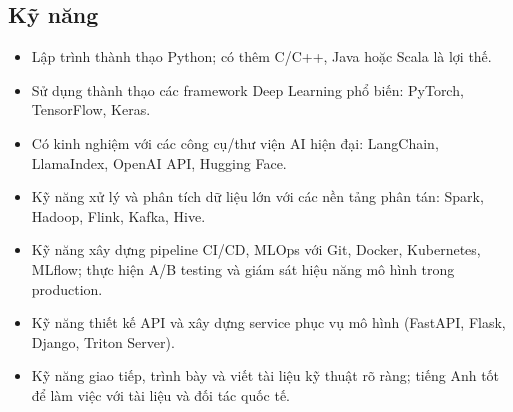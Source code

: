 \subsection{Kỹ năng}
\begin{itemize}
    \item Lập trình thành thạo Python; có thêm C/C++, Java hoặc Scala là lợi thế.
    \item Sử dụng thành thạo các framework Deep Learning phổ biến: PyTorch, TensorFlow, Keras.
    \item Có kinh nghiệm với các công cụ/thư viện AI hiện đại: LangChain, LlamaIndex, OpenAI API, Hugging Face.
    \item Kỹ năng xử lý và phân tích dữ liệu lớn với các nền tảng phân tán: Spark, Hadoop, Flink, Kafka, Hive.
    \item Kỹ năng xây dựng pipeline CI/CD, MLOps với Git, Docker, Kubernetes, MLflow; thực hiện A/B testing và giám sát hiệu năng mô hình trong production.
    \item Kỹ năng thiết kế API và xây dựng service phục vụ mô hình (FastAPI, Flask, Django, Triton Server).
    \item Kỹ năng giao tiếp, trình bày và viết tài liệu kỹ thuật rõ ràng; tiếng Anh tốt để làm việc với tài liệu và đối tác quốc tế.
\end{itemize}
